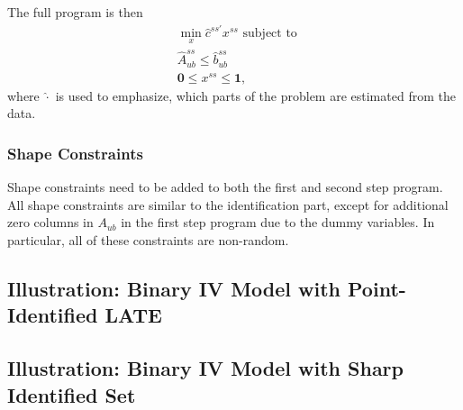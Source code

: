 \documentclass[12pt,a4paper,english]{article} %
\numberwithin{equation}{section}
\numberwithin{figure}{section}
\numberwithin{table}{section}
\begin{document}
The full program is then
\begin{align}
  & \min_x \hat{c}^{ss'}x^{ss} \text{ subject to }\\
  & \hat{A}_{ub}^{ss} \leq \hat{b}_{ub}^{ss} \\
  & \mathbf{0} \leq x^{ss} \leq \mathbf{1},
\end{align}
where $\hat{\cdot}$ is used to emphasize, which parts of the problem are estimated from the data.

\subsubsection{Shape Constraints}
Shape constraints need to be added to both the first and second step program.
All shape constraints are similar to the identification part, except for additional zero columns in $A_{ub}$ in the first step program due to the dummy variables.
In particular, all of these constraints are non-random.


\subsection{Illustration: Binary IV Model with Point-Identified LATE}


\subsection{Illustration: Binary IV Model with Sharp Identified Set}
\end{document}
